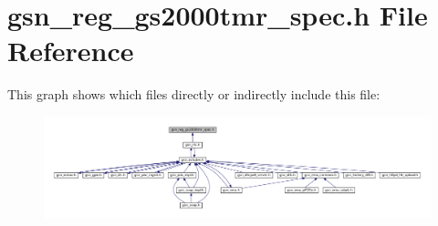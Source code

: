 \hypertarget{a00556}{
\section{gsn\_\-reg\_\-gs2000tmr\_\-spec.h File Reference}
\label{a00556}
}
This graph shows which files directly or indirectly include this file:
\nopagebreak
\begin{figure}[H]
\begin{center}
\leavevmode
\includegraphics[width=400pt]{a00792}
\end{center}
\end{figure}
